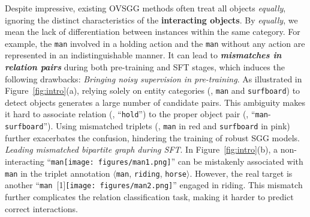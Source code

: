Despite impressive, existing OVSGG methods often treat all objects \textit{equally}, ignoring the distinct characteristics of the \textbf{interacting objects}. By \textit{equally}, we mean the lack of differentiation between instances within the same category. For example, the \texttt{man} involved in a holding action and the \texttt{man} without any action are represented in an indistinguishable manner. It can lead to \textbf{\emph{mismatches in relation pairs}} during both pre-training and SFT stages, which induces the following drawbacks: \hypertarget{Q1}{} \textit{Bringing noisy supervision in pre-training}. As illustrated in Figure~\ref{fig:intro}(a), relying solely on entity categories (\eg, \texttt{man} and \texttt{surfboard}) to detect objects generates a large number of candidate pairs. This ambiguity makes it hard to associate relation (\eg, ``\texttt{hold}'') to the proper object pair (\eg, ``\texttt{man}-\texttt{surfboard}''). Using mismatched triplets (\eg, \texttt{man} in red and \texttt{surfboard} in pink) further exacerbates the confusion, hindering the training of robust SGG models.  \textit{Leading mismatched bipartite graph during SFT}. In Figure~\ref{fig:intro}(b), a non-interacting ``\texttt{man}\texttt{[image: figures/man1.png]}'' can be mistakenly associated with \texttt{man} in the triplet annotation $\langle$\texttt{man}, \texttt{riding}, \texttt{horse}$\rangle$. However, the real target is another ``\texttt{man}~\scalebox{-1}[1]{\texttt{[image: figures/man2.png]}}'' engaged in riding. This mismatch further complicates the relation classification task, making it harder to predict correct interactions.


